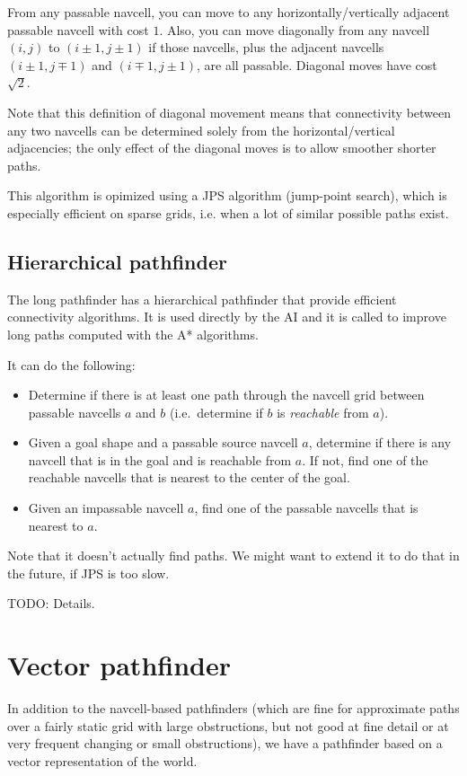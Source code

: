 \documentclass[a4paper,10pt]{article}
\begin{document}
From any passable navcell, you can move to any horizontally/vertically adjacent
passable navcell with cost $1$.
Also, you can move diagonally from any navcell $(i,j)$ to $(i\pm1,j\pm1)$
if those navcells,
plus the adjacent navcells $(i\pm1,j\mp1)$ and $(i\mp1,j\pm1)$,
are all passable.
Diagonal moves have cost $\sqrt{2}$.

Note that this definition of diagonal movement
means that connectivity between any two navcells
can be determined solely from the horizontal/vertical adjacencies;
the only effect of the diagonal moves is to allow smoother shorter paths.

This algorithm is opimized using a JPS algorithm (jump-point search), which is especially efficient on sparse grids, i.e. when a lot of similar possible paths exist.

\subsection{Hierarchical pathfinder}

The long pathfinder has a hierarchical pathfinder that provide efficient connectivity algorithms. It is used directly by the AI and it is called to improve long paths computed with the A* algorithms.

It can do the following:
\begin{itemize}
 \item Determine if there is at least one path through the navcell grid between
 passable navcells $a$ and $b$ (i.e.\ determine if $b$ is \emph{reachable} from $a$).
 \item Given a goal shape and a passable source navcell $a$,
 determine if there is any navcell that is in the goal and is reachable from $a$.
 If not, find one of the reachable navcells that is nearest to the center of the goal.
 \item Given an impassable navcell $a$, find one of the passable navcells that is
 nearest to $a$.
\end{itemize}

Note that it doesn't actually find paths.
We might want to extend it to do that in the future,
if JPS is too slow.

TODO: Details.

\section{Vector pathfinder}

In addition to the navcell-based pathfinders (which are fine for approximate paths
over a fairly static grid with large obstructions,
but not good at fine detail or at very frequent changing or small obstructions),
we have a pathfinder based on a vector representation of the world.
\end{document}
